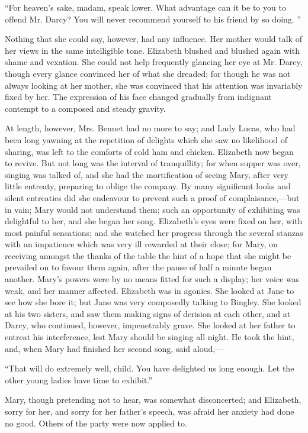 \documentclass[10pt]{book}
\begin{document}
   “For heaven’s sake, madam, speak lower. What advantage can it be to you
to offend Mr. Darcy? You will never recommend yourself to his friend by
so doing.
   ”
  

   Nothing that she could say, however, had any influence. Her mother would
talk of her views in the same intelligible tone. Elizabeth blushed and
blushed again with shame and vexation. She could not help frequently
glancing her eye at Mr. Darcy, though every glance convinced her of what
she dreaded; for though he was not always looking at her mother, she was
convinced that his attention was invariably fixed by her. The expression
of his face changed gradually from indignant contempt to a composed and
steady gravity.
  

   At length, however, Mrs. Bennet had no more to say; and Lady Lucas, who
had been long yawning at the repetition of delights which she saw no
likelihood of sharing, was left to the comforts of cold ham and chicken.
Elizabeth now began to revive. But not long was the interval of
tranquillity; for when supper was over, singing was talked of, and she
had the mortification of seeing Mary, after very little entreaty,
preparing to oblige the company. By many significant looks and silent
entreaties did she endeavour to prevent such a proof of
complaisance,—but in vain; Mary would not understand them; such an
opportunity of exhibiting was delightful to her, and she began her song.
Elizabeth’s eyes were fixed on her, with most painful sensations; and
she watched her progress through the several stanzas with an impatience
which was very ill rewarded at their close; for Mary, on receiving
amongst the thanks of the table the hint of a hope that she might be
prevailed on to favour them again, after the pause of half a minute
began another. Mary’s powers were by no means fitted for such a display;
her voice was weak, and her manner affected. Elizabeth was in agonies.
She looked at Jane to see how she bore it; but Jane was very composedly
   talking to Bingley. She looked at his two sisters, and saw them making
signs of derision at each other, and at Darcy, who continued, however,
impenetrably grave. She looked at her father to entreat his
interference, lest Mary should be singing all night. He took the hint,
and, when Mary had finished her second song, said aloud,—
  

   “That will do extremely well, child. You have delighted us long enough.
Let the other young ladies have time to exhibit.”
  

   Mary, though pretending not to hear, was somewhat disconcerted; and
Elizabeth, sorry for her, and sorry for her father’s speech, was afraid
her anxiety had done no good. Others of the party were now applied to.
  
\end{document}
